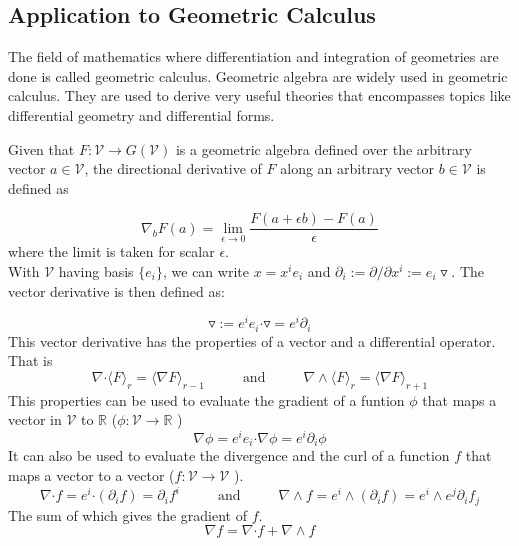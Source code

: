 \documentclass[12pt,onecolumn,letterpaper]{article} %
\begin{document}
\subsection{Application to Geometric Calculus}
The field of mathematics where differentiation and integration of geometries are done is called geometric calculus. Geometric algebra are widely used in geometric calculus.  They are used to derive very useful theories that encompasses  topics like differential geometry and differential forms.


Given that $F:\mathcal{V}\to G(\mathcal{V})$ is a geometric algebra defined over the arbitrary vector $a\in \mathcal{V}$, the directional derivative of $F$ along an arbitrary vector $b\in \mathcal{V}$ is defined as

\begin{equation*}
    \nabla _{b}F(a)=\lim _{\epsilon \rightarrow 0}{\frac {F(a+\epsilon b)-F(a)}{\epsilon }}
\end{equation*} 
where the limit is taken for scalar $\epsilon$. \\
With $\mathcal{V}$ having basis $\{e_i\}$, we can write $x=x^ie_i$ and $\partial_i :=\partial/\partial x^i:=e_i \triangledown$. The vector derivative is then defined as:

$$\triangledown:=e^ie_i\boldsymbol{\cdot} \triangledown=e^i\partial_i$$
This vector derivative has the properties of a vector and a differential operator. That is
$$\nabla \boldsymbol{\cdot}\langle F\rangle_{r}=\langle\nabla F\rangle_{r-1}\hspace{1cm} {\mbox{  and }}\hspace{1cm}  \nabla \wedge\langle F\rangle_{r}=\langle\nabla F\rangle_{r+1}$$
This properties can be used to evaluate the gradient of a funtion $\phi$ that maps a vector in $\mathcal{V}$ to $\mathbb{R}$ ($\phi:\mathcal{V}\to\mathbb{R}$ )
$$\nabla \phi=e^ie_i\boldsymbol{\cdot}\nabla \phi=e^i\partial_i\phi$$
It can also be used to evaluate the divergence and the curl of a function $f$ that maps a vector to a vector ($f:\mathcal{V}\to\mathcal{V}$ ).
$$\nabla \boldsymbol{\cdot}f=e^i\boldsymbol{\cdot}(\partial_i f)=\partial_if^i\hspace{1cm} {\mbox{  and }}\hspace{1cm}  \nabla \wedge f=e^i\wedge (\partial_i f)=e^i\wedge e^j \partial_i f_j$$
The sum of which gives the gradient of $f$.
$$\nabla f=\nabla \boldsymbol{\cdot}f + \nabla \wedge f$$
\end{document}
